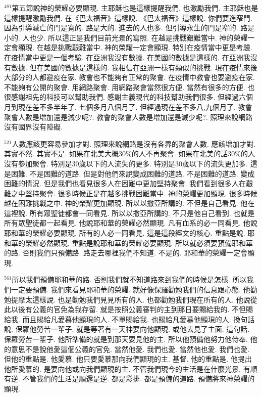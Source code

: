 \documentclass{book}
\begin{document}
$^{481}$第五節說神的榮耀必要顯現.
主耶穌也是這樣提醒我們.
也激勵我們.
主耶穌也是這樣提醒激勵我們.
在《巴太福音》這樣說.
《巴太福音》這樣說.
你們要進窄門.
因為引導滅亡的門是寬的.
路是大的.
進去的人也多.
但引導永生的門是窄的.
路是小的.
人也少.
所以這正是我們目前光景的寫照.
在越是挑戰艱難當中.
神的榮耀一定會顯現.
在越是挑戰艱難當中.
神的榮耀一定會顯現.
特別在疫情當中更是考驗.
在疫情當中更是一個考驗.
在亞洲我沒有數據.
在美國的數據是這樣的.
在亞洲我沒有數據.
但在美國的數據是這樣的.
我相信在亞洲一樣有類似的挑戰.
現在疫情來後大部分的人都避疫在家.
教會也不能夠有正常的聚會.
在疫情中教會也要避疫在家.
不能夠有公開的聚會.
用網路聚會.
用網路聚會當然很方便.
當然有很多的方便.
也很感謝祖先的科技可以幫助我們.
感謝主義現代的科技幫助我們很多.
但經過六個月到現在差不多半年了.
七個多月八個月了.
但經過現在差不多八,九個月了.
教會聚會人數是增加還是減少呢?.
教會的聚會人數是增加還是減少呢?.
照理來說網路沒有國界沒有障礙.

$^{521}$人數應該更容易參加才對.
照理來說網路是沒有各界的聚會人數.
應該增加才對.
其實不然.
其實不是.
如果在北美大概30\%的人不再聚會.
如果在北美的話30\%的人沒有參加聚會.
特別是30歲以下的人流失的更多.
特別是30歲以下的流失更加多.
這是困難.
不是困難的道路.
但是對他們來說變成困難的道路.
不是困難的道路.
變成困難的情況.
但是我們也看見很多人在困難中更加堅持聚會.
我們看到很多人在艱難之中堅持聚會.
很多時候正是在越多挑戰困難當中.
神的榮耀更加顯現.
很多時候越在困難挑戰之中.
神的榮耀更加顯現.
所以以撒亞所講的.
不但是自己看見.
他在這裡說.
所有眾聖徒都會一同看見.
所以以撒亞所講的.
不只是他自己看到.
也就是所有眾聖徒都一起看見.
他說耶和華的榮耀必然顯現.
凡有血系的必一同看見.
他說耶和華的榮耀必要顯現.
所有的人必一同看見.
這是這段經文的核心.
重點是說.
耶和華的榮耀必然顯現.
重點是說耶和華的榮耀必要顯現.
所以就必須要預備耶和華的路.
否則我們只預備路.
路走去哪裡我們不知道.
不是的.
耶和華的榮耀一定會顯現.

$^{561}$所以我們預備耶和華的路.
否則我們就不知道路來到我們的時候是怎樣.
所以我們一定要預備.
我們來看見耶和華的榮耀.
就好像保羅勸勉我們的信息跟心態.
他勸勉提摩太這樣說.
也是勸勉我們見見所有的人.
也都勸勉我們現在所有的人.
他說從此以後有公義的官免為我存留.
就是按照公義審判的主到那日要賜給我的.
不但賜給我.
而且賜給凡愛慕他顯現的人.
不單賜給我.
也賜給凡愛慕他顯現的人.
換句話說.
保羅他勞苦一輩子.
就是等著有一天神要向他顯現.
或他去見了主面.
這句話.
保羅勞苦一輩子.
他所準備的就是到那天要見他的主.
所以他預備他努力他侍奉.
他的意思不是說他愛這個公義的官免.
當然他愛.
我們也愛.
當然他也愛.
我們也愛.
但他的重點是.
他愛慕.
他只要愛慕那向我們顯現的主.
基督.
他的重點是.
他提出他所愛慕的.
是要向他或向我們顯現的主.
不管我們現今的生活是在什麼光景.
有順有逆.
不管我們的生活是順還是逆.
都是彩排.
都是預備的道路.
預備將來神榮耀的顯現.
\end{document}

